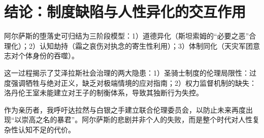 \chapter{结论：制度缺陷与人性异化的交互作用}

\hspace*{2em}阿尔萨斯的堕落史可归结为三阶段模型：1）道德异化（斯坦索姆的“必要之恶”合理化）；2）认知劫持（霜之哀伤对执念的寄生性利用）；3）体制同化（天灾军团意志对个体身份的吞噬）。

这一过程揭示了艾泽拉斯社会治理的两大隐患：1）圣骑士制度的伦理局限性：过度强调牺牲与绝对正义，缺乏对极端情境的应对指南；2）权力监督机制的缺失：洛丹伦王室未能建立对王子的制衡体系，导致其独断行为失控。

作为亲历者，我呼吁达拉然与白银之手建立联合伦理委员会，以防止未来再度出现“以崇高之名的暴君”。阿尔萨斯的悲剧并非个人的失败，而是整个时代对人性复杂性认知不足的代价。

